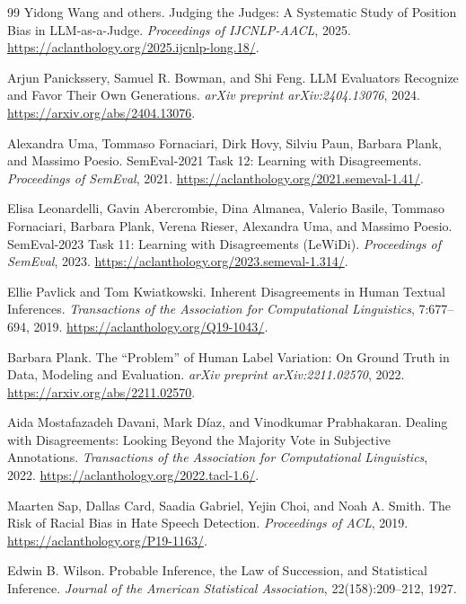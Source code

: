 \documentclass[11pt]{article}
\begin{document}
\begin{thebibliography}{99}
Yidong Wang and others.
\newblock Judging the Judges: A Systematic Study of Position Bias in LLM-as-a-Judge.
\newblock \emph{Proceedings of IJCNLP-AACL}, 2025.
\newblock \url{https://aclanthology.org/2025.ijcnlp-long.18/}.

Arjun Panickssery, Samuel R. Bowman, and Shi Feng.
\newblock LLM Evaluators Recognize and Favor Their Own Generations.
\newblock \emph{arXiv preprint arXiv:2404.13076}, 2024.
\newblock \url{https://arxiv.org/abs/2404.13076}.

Alexandra Uma, Tommaso Fornaciari, Dirk Hovy, Silviu Paun, Barbara Plank, and Massimo Poesio.
\newblock SemEval-2021 Task 12: Learning with Disagreements.
\newblock \emph{Proceedings of SemEval}, 2021.
\newblock \url{https://aclanthology.org/2021.semeval-1.41/}.

Elisa Leonardelli, Gavin Abercrombie, Dina Almanea, Valerio Basile, Tommaso Fornaciari, Barbara Plank, Verena Rieser, Alexandra Uma, and Massimo Poesio.
\newblock SemEval-2023 Task 11: Learning with Disagreements (LeWiDi).
\newblock \emph{Proceedings of SemEval}, 2023.
\newblock \url{https://aclanthology.org/2023.semeval-1.314/}.

Ellie Pavlick and Tom Kwiatkowski.
\newblock Inherent Disagreements in Human Textual Inferences.
\newblock \emph{Transactions of the Association for Computational Linguistics}, 7:677--694, 2019.
\newblock \url{https://aclanthology.org/Q19-1043/}.

Barbara Plank.
\newblock The ``Problem'' of Human Label Variation: On Ground Truth in Data, Modeling and Evaluation.
\newblock \emph{arXiv preprint arXiv:2211.02570}, 2022.
\newblock \url{https://arxiv.org/abs/2211.02570}.

Aida Mostafazadeh Davani, Mark D\'{i}az, and Vinodkumar Prabhakaran.
\newblock Dealing with Disagreements: Looking Beyond the Majority Vote in Subjective Annotations.
\newblock \emph{Transactions of the Association for Computational Linguistics}, 2022.
\newblock \url{https://aclanthology.org/2022.tacl-1.6/}.

Maarten Sap, Dallas Card, Saadia Gabriel, Yejin Choi, and Noah A. Smith.
\newblock The Risk of Racial Bias in Hate Speech Detection.
\newblock \emph{Proceedings of ACL}, 2019.
\newblock \url{https://aclanthology.org/P19-1163/}.

Edwin B. Wilson.
\newblock Probable Inference, the Law of Succession, and Statistical Inference.
\newblock \emph{Journal of the American Statistical Association}, 22(158):209--212, 1927.


\end{thebibliography}
\end{document}
